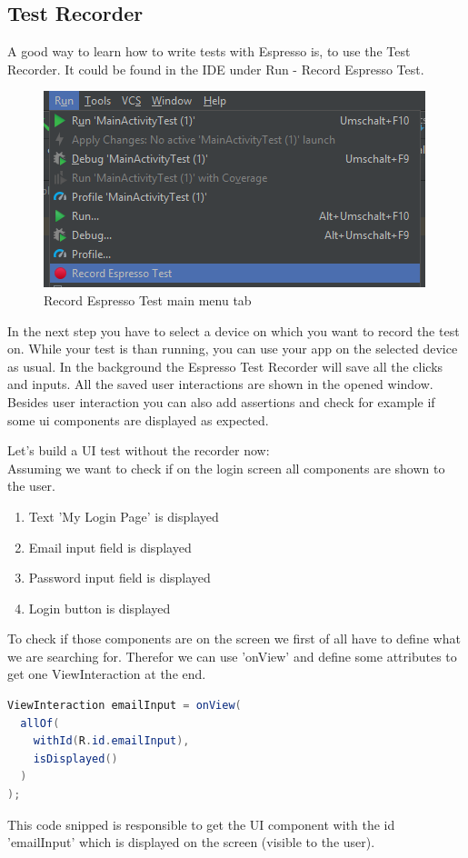 	\subsection{Test Recorder}
	A good way to learn how to write tests with Espresso is, to use the Test Recorder. It could be found in the IDE under Run - Record Espresso Test.
	
	\begin{figure}[H]
		\centering
		\includegraphics[width=0.5\linewidth]{images/record_espresso_test}
		\caption{Record Espresso Test main menu tab}
		\label{fig:recordespressotest}
	\end{figure}

	In the next step you have to select a device on which you want to record the test on. While your test is than running, you can use your app on the selected device as usual. In the background the Espresso Test Recorder will save all the clicks and inputs. All the saved user interactions are shown in the opened window. Besides user interaction you can also add assertions and check for example if some ui components are displayed as expected.
	
	Let's build a UI test without the recorder now:\\
	Assuming we want to check if on the login screen all components are shown to the user.
	
	\begin{enumerate}
		\itemsep0pt
		\item Text 'My Login Page' is displayed
		\item Email input field is displayed
		\item Password input field is displayed
		\item Login button is displayed
	\end{enumerate}

	To check if those components are on the screen we first of all have to define what we are searching for. Therefor we can use 'onView' and define some attributes to get one ViewInteraction at the end.
	
	\begin{lstlisting}[language=Java]
ViewInteraction emailInput = onView(
  allOf(
    withId(R.id.emailInput),
    isDisplayed()
  )
);
	\end{lstlisting}
	This code snipped is responsible to get the UI component with the id 'emailInput' which is displayed on the screen (visible to the user).
	
